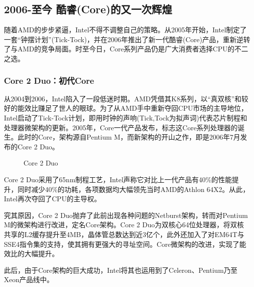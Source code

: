 \documentclass[UTF8]{ctexart}
\begin{document}
\subsection{2006-至今 酷睿(Core)的又一次辉煌}
随着AMD的步步紧逼，Intel不得不调整自己的策略。从2005年开始，Intel制定了一套“钟摆计划”(Tick-Tock)，并在2006年推出了新一代酷睿(Core)产品，重新逆转了与AMD的竞争局面。时至今日，Core系列产品仍是广大消费者选择CPU的不二之选。
\subsubsection{Core 2 Duo：初代Core}
从2004到2006，Intel陷入了一段低迷时期。AMD凭借其K8系列，以“真双核”和较好的能效比赚足了世人的眼球。为了从AMD手中重新夺回CPU市场的主导地位，Intel启动了Tick-Tock计划，即用时钟的声响(Tick,Tock为拟声词)代表芯片制程和处理器微架构的更新。2005年，Core一代产品发布，标志这Core系列处理器的诞生。此时的Core，架构源自Pentium M，而新架构的开山之作，即是2006年7月发布的Core 2 Duo。
\begin{figure}[H]
    \centering
    \caption{Core 2 Duo}
\end{figure}

Core 2 Duo采用了65nm制程工艺，Intel声称它对比上一代产品有40\%的性能提升，同时减少40\%的功耗，各项数据均大幅领先当时AMD的Athlon 64X2。从此，Intel再次夺回了CPU的主导权。

究其原因，Core 2 Duo抛弃了此前出现各种问题的Netburst架构，转而对Pentium M的微架构进行改进，定名Core架构。Core 2 Duo为双核心64位处理器，将双核共享的L2缓存提升至4MB，晶体管总数达到近3亿个，此外还加入了对EM64T与SSE4指令集的支持，使其拥有更强大的寻址空间。Core微架构的改进，实现了能效比的大幅提升。

此后，由于Core架构的巨大成功，Intel将其也运用到了Celeron、Pentium乃至Xeon产品线中。
\end{document}
